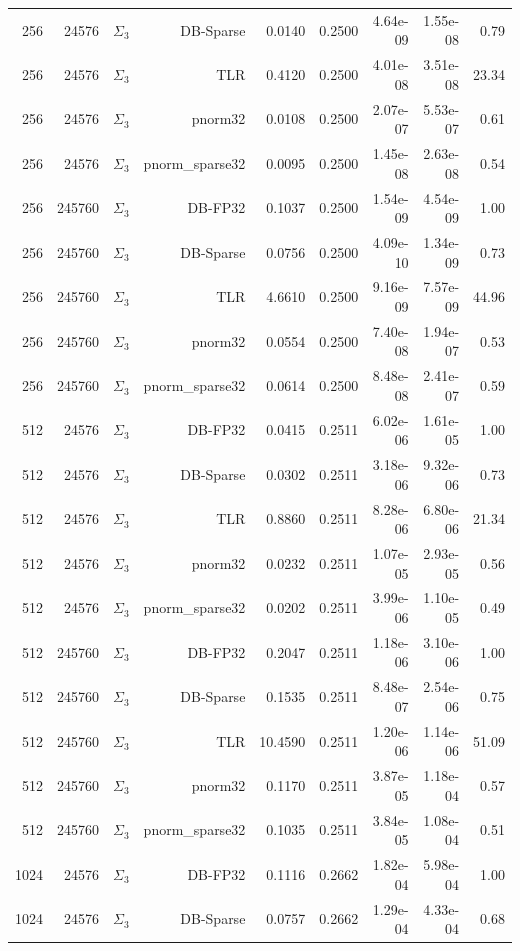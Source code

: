 \begin{tabular}{|r|r|r|r|r|r|r|r|r|}
  256 & 24576 & $\Sigma_3$ & DB-Sparse & 0.0140 & 0.2500 & 4.64e-09 & 1.55e-08 & 0.79 \\
  256 & 24576 & $\Sigma_3$ & TLR & 0.4120 & 0.2500 & 4.01e-08 & 3.51e-08 & 23.34 \\
  256 & 24576 & $\Sigma_3$ & pnorm32 & 0.0108 & 0.2500 & 2.07e-07 & 5.53e-07 & 0.61 \\
  256 & 24576 & $\Sigma_3$ & pnorm\_sparse32 & 0.0095 & 0.2500 & 1.45e-08 & 2.63e-08 & 0.54 \\
  256 & 245760 & $\Sigma_3$ & DB-FP32 & 0.1037 & 0.2500 & 1.54e-09 & 4.54e-09 & 1.00 \\
  256 & 245760 & $\Sigma_3$ & DB-Sparse & 0.0756 & 0.2500 & 4.09e-10 & 1.34e-09 & 0.73 \\
  256 & 245760 & $\Sigma_3$ & TLR & 4.6610 & 0.2500 & 9.16e-09 & 7.57e-09 & 44.96 \\
  256 & 245760 & $\Sigma_3$ & pnorm32 & 0.0554 & 0.2500 & 7.40e-08 & 1.94e-07 & 0.53 \\
  256 & 245760 & $\Sigma_3$ & pnorm\_sparse32 & 0.0614 & 0.2500 & 8.48e-08 & 2.41e-07 & 0.59 \\
  512 & 24576 & $\Sigma_3$ & DB-FP32 & 0.0415 & 0.2511 & 6.02e-06 & 1.61e-05 & 1.00 \\
  512 & 24576 & $\Sigma_3$ & DB-Sparse & 0.0302 & 0.2511 & 3.18e-06 & 9.32e-06 & 0.73 \\
  512 & 24576 & $\Sigma_3$ & TLR & 0.8860 & 0.2511 & 8.28e-06 & 6.80e-06 & 21.34 \\
  512 & 24576 & $\Sigma_3$ & pnorm32 & 0.0232 & 0.2511 & 1.07e-05 & 2.93e-05 & 0.56 \\
  512 & 24576 & $\Sigma_3$ & pnorm\_sparse32 & 0.0202 & 0.2511 & 3.99e-06 & 1.10e-05 & 0.49 \\
  512 & 245760 & $\Sigma_3$ & DB-FP32 & 0.2047 & 0.2511 & 1.18e-06 & 3.10e-06 & 1.00 \\
  512 & 245760 & $\Sigma_3$ & DB-Sparse & 0.1535 & 0.2511 & 8.48e-07 & 2.54e-06 & 0.75 \\
  512 & 245760 & $\Sigma_3$ & TLR & 10.4590 & 0.2511 & 1.20e-06 & 1.14e-06 & 51.09 \\
  512 & 245760 & $\Sigma_3$ & pnorm32 & 0.1170 & 0.2511 & 3.87e-05 & 1.18e-04 & 0.57 \\
  512 & 245760 & $\Sigma_3$ & pnorm\_sparse32 & 0.1035 & 0.2511 & 3.84e-05 & 1.08e-04 & 0.51 \\
  1024 & 24576 & $\Sigma_3$ & DB-FP32 & 0.1116 & 0.2662 & 1.82e-04 & 5.98e-04 & 1.00 \\
  1024 & 24576 & $\Sigma_3$ & DB-Sparse & 0.0757 & 0.2662 & 1.29e-04 & 4.33e-04 & 0.68 \\

\end{tabular}
